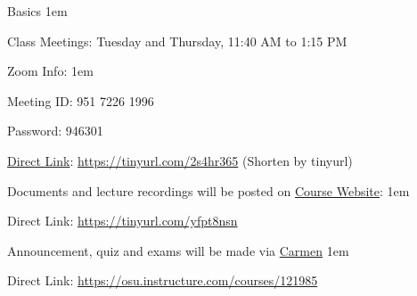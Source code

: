 \documentclass[11pt,aspectratio=43]{beamer}
\let\olditemize=\itemize
\let\endolditemize=\enditemize
\renewenvironment{itemize}{\olditemize \itemsep1em}{\endolditemize}
\theoremstyle{definition}
\begin{document}
\begin{frame}{Basics}
\label{slide:Basics}
    \begin{itemize}
        \item Class Meetings: Tuesday and Thursday, 11:40 AM to 1:15 PM
        \item Zoom Info:
        \begin{itemize}
            \item Meeting ID: 951 7226 1996
            \item Password: 946301
            \item \href{https://tinyurl.com/2s4hr365}{Direct Link}:
                    \href{https://tinyurl.com/2s4hr365}{https://tinyurl.com/2s4hr365}
                    (Shorten by tinyurl)
        \end{itemize}
        \item Documents and lecture recordings will be posted on \href{https://tinyurl.com/yfpt8nsn}{Course Website}:
        \begin{itemize}
            \item Direct Link: \href{https://tinyurl.com/yfpt8nsn}{https://tinyurl.com/yfpt8nsn}
        \end{itemize}
        \item Announcement, quiz and exams will be made via \href{https://osu.instructure.com/courses/121985}{Carmen}
        \begin{itemize}
            \item Direct Link: \href{https://osu.instructure.com/courses/121985}{https://osu.instructure.com/courses/121985}
        \end{itemize}
    \end{itemize}
\end{frame}
\end{document}

